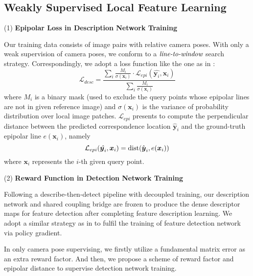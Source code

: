 \documentclass[journal]{IEEEtran}
\begin{document}
\subsection{Weakly Supervised Local Feature Learning} \label{loss}

(1) \textbf{Epipolar Loss in Description Network Training}

Our training data consists of image pairs with relative camera poses. With only a weak supervision of camera poses, we conform to a $\emph{line-to-window}$ search strategy. Correspondingly, we adopt a loss function like the one as in \cite{li2022decoupling}:
\begin{equation}\label{1}
        \mathcal{L}_{desc}  =\frac{\sum_{i}{\frac{M_{i}}{\sigma(\boldsymbol{x}_{i})}\cdot \mathcal{L}_{epi}(\hat{\boldsymbol{y}_{i}},\boldsymbol{x}_{i})}}{\sum_{i}\frac{M_{i}}{\sigma(\boldsymbol{x}_{i})}}
\end{equation}
where $M_{i}$ is a binary mask (used to exclude the query points whose epipolar lines are not in given reference image) and $\sigma\left(\boldsymbol{x}_{i}\right)$ is the variance of probability distribution over local image patches. $\mathcal{L}_{epi}$ presents to compute the perpendicular distance between the predicted correspondence location $\hat{\boldsymbol{y}}_{i}$ and the ground-truth epipolar line $e(\boldsymbol{x}_{i})$, namely 
\begin{equation}\label{eq-epi}
        \mathcal{L}_{epi}(\hat{\boldsymbol{y}_{i}},\boldsymbol{x}_{i})={\rm dist}(\hat{\boldsymbol{y}}_{i},e(\boldsymbol{x}_{i}))
\end{equation}
where $\boldsymbol{x}_{i}$ represents the $i$-th given query point.



(2) \textbf{Reward Function in Detection Network Training}

Following a describe-then-detect pipeline with decoupled training, our description network and shared coupling bridge are frozen to produce the dense descriptor maps for feature detection after completing feature description learning. We adopt a similar strategy as in \cite{disk,li2022decoupling} to fulfil the training of feature detection network via policy gradient.

In only camera pose supervising, 
we firstly utilize a fundamental matrix error as an extra reward factor. And then, we propose a scheme of reward factor and epipolar distance to supervise detection network training.
\end{document}
